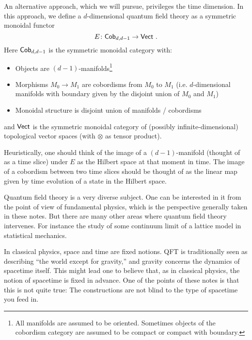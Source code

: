 An alternative approach, which we will pursue, privileges the time dimension.
In this approach, we define a $d$-dimensional quantum field theory as a symmetric monoidal
functor
\begin{equation*}
	E \colon \mathsf{Cob}_{d,d-1} \to \mathsf{Vect} \ .
\end{equation*}
Here $\mathsf{Cob}_{d,d-1}$ is the symmetric monoidal category with:
\begin{itemize}
	\item Objects are $\left(d-1\right)$-manifolds\footnote{All manifolds are assumed to be
    oriented. Sometimes objects of the cobordism category
    are assumed to be compact or compact with boundary.}
	\item Morphisms $M_0 \to M_1$ are cobordisms from $M_0$ to $M_1$ (i.e. $d$-dimensional
    manifolds with boundary given by the disjoint union of $M_0$ and $M_1$)
	\item Monoidal structure is disjoint union of manifolds / cobordisms
\end{itemize}
and $\mathsf{Vect}$ is the symmetric monoidal category of (possibly infinite-dimensional)
topological vector spaces (with $\otimes$ as tensor product).

\begin{rmk}
Heuristically, one should think of the image of a $\left(d-1\right)$-manifold (thought of
as a time slice) under $E$ as the Hilbert space at that moment in time. 
The image of a cobordism between two time slices should be thought of as the linear map
given by time evolution of a state in the Hilbert space. 
\end{rmk}

Quantum field theory is a very diverse subject. 
One can be interested in it from the point of view of fundamental physics, which is the
perspective generally taken in these notes. 
But there are many other areas where quantum field theory intervenes. 
For instance the study of some continuum limit of a lattice model in statistical
mechanics.

In classical physics, space and time are fixed notions.
QFT is traditionally seen as describing ``the world except for gravity,''
and gravity concerns the dynamics of spacetime itself.
This might lead one to believe that, as in classical physics, the notion of spacetime is
fixed in advance.
One of the points of these notes is that this is not quite true:
The constructions are not blind to the type of spacetime you feed in.

